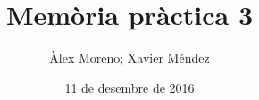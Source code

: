 \documentclass[catalan,parskip=half*,oneside,DIV=11,hidelinks]{scrreprt}
\gdef\accumcontent{}
\newcommand{\dumpaccum}{\accumcontent \gdef\accumcontent{}}
\let\myTOC\tableofcontents
\renewcommand\tableofcontents{%
  \pdfbookmark[1]{\contentsname}{}
  \myTOC }
\begin{document}
\title{Memòria pràctica 3}
\date{11 de desembre de 2016}
\author{Àlex Moreno; Xavier Méndez}

\maketitle

\tableofcontents
\clearpage


\newcommand{\cclearpage}{}
\newcommand{\projectname}{}
\newcommand{\inputproject}[1]{
  \dumpaccum
  \renewcommand{\projectname}{#1}
  
}
\inputproject{3}
\inputproject{3-extra1}
\inputproject{3-extra2}
\inputproject{3-extra3}
\end{document}
